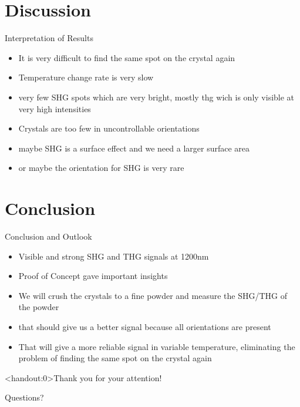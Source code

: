 \documentclass[handout]{beamer} %
\begin{document}
    \section{Discussion}
    \begin{frame}{Interpretation of Results}
      \begin{itemize}
        \item It is very difficult to find the same spot on the crystal again
        \item Temperature change rate is very slow
        \item very few SHG spots which are very bright, mostly thg wich is only visible at very high intensities
        \item Crystals are too few in uncontrollable orientations
        \item maybe SHG is a surface effect and we need a larger surface area
        \item or maybe the orientation for SHG is very rare
      \end{itemize}
    \end{frame}

    \section{Conclusion}
    \begin{frame}{Conclusion and Outlook}
      \begin{itemize}
        \item Visible and strong SHG and THG signals at 1200nm

        \item Proof of Concept gave important insights
        \item We will crush the crystals to a fine powder and measure the SHG/THG of the powder
        \item that should give us a better signal because all orientations are present
        \item That will give a more reliable signal in variable temperature, eliminating the problem of finding the same spot on the crystal again
      \end{itemize}
    \end{frame}

    \begin{frame}<handout:0>{Thank you for your attention!}
      \begin{center}
        \Huge Questions?
      \end{center}
    \end{frame}
\end{document}
